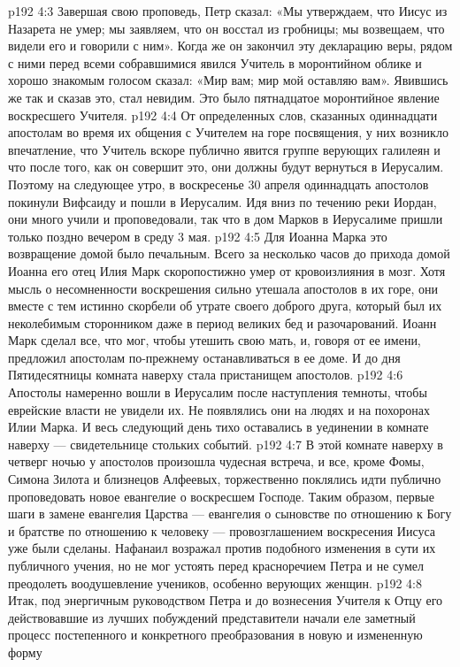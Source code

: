 \vs p192 4:3 Завершая свою проповедь, Петр сказал: «Мы утверждаем, что Иисус из Назарета не умер; мы заявляем, что он восстал из гробницы; мы возвещаем, что видели его и говорили с ним». Когда же он закончил эту декларацию веры, рядом с ними перед всеми собравшимися явился Учитель в моронтийном облике и хорошо знакомым голосом сказал: «Мир вам; мир мой оставляю вам». Явившись же так и сказав это, стал невидим. Это было пятнадцатое моронтийное явление воскресшего Учителя.
\vs p192 4:4 \pc От определенных слов, сказанных одиннадцати апостолам во время их общения с Учителем на горе посвящения, у них возникло впечатление, что Учитель вскоре публично явится группе верующих галилеян и что после того, как он совершит это, они должны будут вернуться в Иерусалим. Поэтому на следующее утро, в воскресенье 30 апреля одиннадцать апостолов покинули Вифсаиду и пошли в Иерусалим. Идя вниз по течению реки Иордан, они много учили и проповедовали, так что в дом Марков в Иерусалиме пришли только поздно вечером в среду 3 мая.
\vs p192 4:5 \pc Для Иоанна Марка это возвращение домой было печальным. Всего за несколько часов до прихода домой Иоанна его отец Илия Марк скоропостижно умер от кровоизлияния в мозг. Хотя мысль о несомненности воскрешения сильно утешала апостолов в их горе, они вместе с тем истинно скорбели об утрате своего доброго друга, который был их неколебимым сторонником даже в период великих бед и разочарований. Иоанн Марк сделал все, что мог, чтобы утешить свою мать, и, говоря от ее имени, предложил апостолам по\hyp{}прежнему останавливаться в ее доме. И до дня Пятидесятницы комната наверху стала пристанищем апостолов.
\vs p192 4:6 \pc Апостолы намеренно вошли в Иерусалим после наступления темноты, чтобы еврейские власти не увидели их. Не появлялись они на людях и на похоронах Илии Марка. И весь следующий день тихо оставались в уединении в комнате наверху --- свидетельнице стольких событий.
\vs p192 4:7 В этой комнате наверху в четверг ночью у апостолов произошла чудесная встреча, и все, кроме Фомы, Симона Зилота и близнецов Алфеевых, торжественно поклялись идти публично проповедовать новое евангелие о воскресшем Господе. Таким образом, первые шаги в замене евангелия Царства --- евангелия о сыновстве по отношению к Богу и братстве по отношению к человеку --- провозглашением воскресения Иисуса уже были сделаны. Нафанаил возражал против подобного изменения в сути их публичного учения, но не мог устоять перед красноречием Петра и не сумел преодолеть воодушевление учеников, особенно верующих женщин.
\vs p192 4:8 Итак, под энергичным руководством Петра и до вознесения Учителя к Отцу его действовавшие из лучших побуждений представители начали еле заметный процесс постепенного и конкретного преобразования  в новую и измененную форму 
